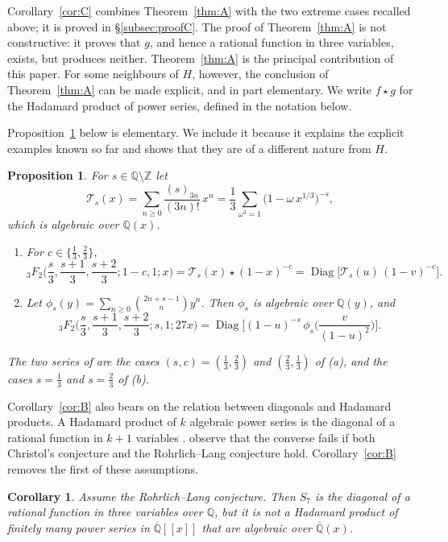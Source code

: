 \documentclass[11pt]{amsart}
\newtheorem{maincor}[mainthm]{Corollary}
\newtheorem{mainprop}[mainthm]{Proposition}
\theoremstyle{definition}
\theoremstyle{remark}
\numberwithin{equation}{section}
\newcommand{\Q}{\mathbb{Q}}
\newcommand{\Z}{\mathbb{Z}}
\newcommand{\Qb}{\overline{\mathbb{Q}}}
\newcommand{\cT}{\mathcal{T}}
\DeclareMathOperator{\Diag}{Diag}
\begin{document}
Corollary~\ref{cor:C} combines Theorem~\ref{thm:A} with the two extreme cases recalled above; it is proved in \S\ref{subsec:proofC}. The proof of Theorem~\ref{thm:A} is not constructive: it proves that $g$, and hence a rational function in three variables, exists, but produces neither. Theorem~\ref{thm:A} is the principal contribution of this paper. For some neighbours of $H$, however, the conclusion of Theorem~\ref{thm:A} can be made explicit, and in part elementary. We write $f\star g$ for the Hadamard product of power series, defined in the notation below.

Proposition~\ref{prop:D} below is elementary. We include it because it explains the explicit examples known so far and shows that they are of a different nature from $H$.

\begin{mainprop}\label{prop:D}
For $s\in\Q\setminus\Z$ let
\[
\cT_s(x)=\sum_{n\ge0}\frac{(s)_{3n}}{(3n)!}\,x^n=\frac13\sum_{\omega^3=1}\big(1-\omega\,x^{1/3}\big)^{-s},
\]
which is algebraic over $\Q(x)$.
\begin{enumerate}[label=\textup{(\alph*)},leftmargin=2em]
\item For $c\in\{\frac13,\frac23\}$,
\[
{}_3F_2\Big(\frac s3,\frac{s+1}3,\frac{s+2}3;1-c,1;x\Big)=\cT_s(x)\star(1-x)^{-c}=\Diag\big[\cT_s(u)\,(1-v)^{-c}\big].
\]
\item Let $\phi_s(y)=\sum_{n\ge0}\binom{2n+s-1}{n}y^n$. Then $\phi_s$ is algebraic over $\Q(y)$, and
\[
{}_3F_2\Big(\frac s3,\frac{s+1}3,\frac{s+2}3;s,1;27x\Big)=\Diag\Big[(1-u)^{-s}\,\phi_s\Big(\frac{v}{(1-u)^2}\Big)\Big].
\]
\end{enumerate}
The two series of \citet{AbdelazizKoutschanMaillard2020} are the cases $(s,c)=(\frac13,\frac23)$ and $(\frac23,\frac13)$ of \textup{(a)}, and the cases $s=\frac13$ and $s=\frac23$ of \textup{(b)}.
\end{mainprop}

Corollary~\ref{cor:B} also bears on the relation between diagonals and Hadamard products. A Hadamard product of $k$ algebraic power series is the diagonal of a rational function in $k+1$ variables \citep[Proposition~4.1]{HarderKramerMiller2026}. \citet[Remark~4.2]{HarderKramerMiller2026} observe that the converse fails if both Christol's conjecture and the Rohrlich--Lang conjecture hold. Corollary~\ref{cor:B} removes the first of these assumptions.

\begin{maincor}\label{cor:E}
Assume the Rohrlich--Lang conjecture. Then $S_7$ is the diagonal of a rational function in three variables over $\Q$, but it is not a Hadamard product of finitely many power series in $\Qb[[x]]$ that are algebraic over $\Qb(x)$.
\end{maincor}
\end{document}
